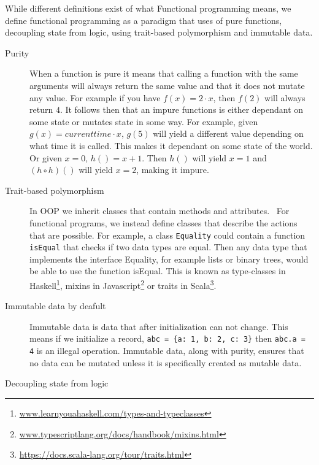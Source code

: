  While different definitions exist of what Functional programming means, we
 define functional programming as a paradigm that uses of pure functions,
 decoupling state from logic, using trait-based polymorphism and
 immutable data.

\begin{description}
\item[ Purity ]

When a function is pure it means that calling a function with the same arguments
        will always return the same value and that it does not mutate any value.
        For example if you have $f(x) = 2\cdot x$, then $f(2)$ will always
        return $4$. It follows then that an impure functions is either dependant
        on some state or mutates state in some way. For example, given $g(x) =
        currenttime \cdot x$, $g(5)$ will yield a different value depending on
        what time it is called. This makes it dependant on some state of the
        world. Or given $x=0$, $h()=x+1$. Then $h()$ will yield $x=1$ and $(h
        \circ h)()$ will yield $x=2$, making it impure.~\cite{wikipedia_pure}

	\item[ Trait-based polymorphism ]

		In OOP we inherit classes that contain methods and
attributes.~\cite{Gamma:1995:DPE:186897} For functional programs, we instead
define classes that describe the actions that are possible. For example, a
class \texttt{Equality} could contain a function \texttt{isEqual} that checks
if two data types are equal. Then any data type that implements the interface
Equality, for example lists or binary trees, would be able to use the function
isEqual.  This is known as type-classes in
Haskell\footnote{\url{www.learnyouahaskell.com/types-and-typeclasses}}, mixins
in Javascript\footnote{\url{www.typescriptlang.org/docs/handbook/mixins.html}}
or traits in Scala\footnote{\url{https://docs.scala-lang.org/tour/traits.html}}.

\item[ Immutable data by deafult ]

Immutable data is data that after initialization can not change. This means if
we initialize a record, \texttt{abc = \{a: 1, b: 2, c: 3\}} then \texttt{abc.a
= 4} is an illegal operation. Immutable data, along with purity, ensures that
no data can be mutated unless it is specifically created as mutable data.

\item[Decoupling state from logic]


\end{description}
